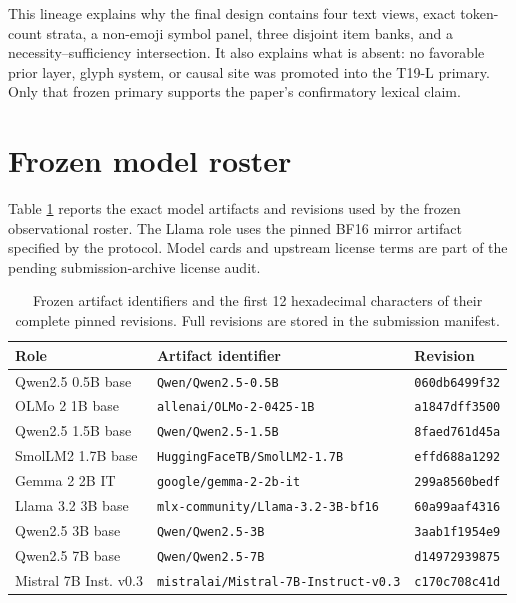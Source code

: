 \documentclass{article}
\begin{document}
This lineage explains why the final design contains four text views, exact
token-count strata, a non-emoji symbol panel, three disjoint item banks, and a
necessity--sufficiency intersection. It also explains what is absent: no
favorable prior layer, glyph system, or causal site was promoted into the
T19-L primary. Only that frozen primary supports the paper's confirmatory
lexical claim.

\section{Frozen model roster}
\label{app:models}

Table \ref{tab:models} reports the exact model artifacts and revisions used by
the frozen observational roster. The Llama role uses the pinned BF16 mirror
artifact specified by the protocol. Model cards and upstream license terms are
part of the pending submission-archive license audit.

\begin{table}[H]
\centering
\scriptsize
\setlength{\tabcolsep}{3.5pt}
\begin{tabular}{lll}
\toprule
Role & Artifact identifier & Revision \\
\midrule
Qwen2.5 0.5B base & \texttt{Qwen/Qwen2.5-0.5B} & \texttt{060db6499f32} \\
OLMo 2 1B base & \texttt{allenai/OLMo-2-0425-1B} & \texttt{a1847dff3500} \\
Qwen2.5 1.5B base & \texttt{Qwen/Qwen2.5-1.5B} & \texttt{8faed761d45a} \\
SmolLM2 1.7B base & \texttt{HuggingFaceTB/SmolLM2-1.7B} & \texttt{effd688a1292} \\
Gemma 2 2B IT & \texttt{google/gemma-2-2b-it} & \texttt{299a8560bedf} \\
Llama 3.2 3B base & \texttt{mlx-community/Llama-3.2-3B-bf16} & \texttt{60a99aaf4316} \\
Qwen2.5 3B base & \texttt{Qwen/Qwen2.5-3B} & \texttt{3aab1f1954e9} \\
Qwen2.5 7B base & \texttt{Qwen/Qwen2.5-7B} & \texttt{d14972939875} \\
Mistral 7B Inst. v0.3 & \texttt{mistralai/Mistral-7B-Instruct-v0.3} & \texttt{c170c708c41d} \\
\bottomrule
\end{tabular}
\caption{Frozen artifact identifiers and the first 12 hexadecimal characters
of their complete pinned revisions. Full revisions are stored in the
submission manifest.}
\label{tab:models}
\end{table}
\end{document}
